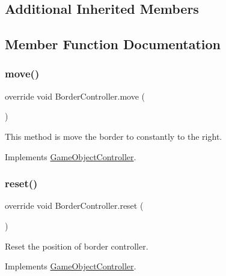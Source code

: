 \subsection*{Additional Inherited Members}


\subsection{Member Function Documentation}
\hypertarget{class_border_controller_ac466a3afffc866364d246b57041c81b2}{}\label{class_border_controller_ac466a3afffc866364d246b57041c81b2} 
\subsubsection{\texorpdfstring{move()}{move()}}
{\footnotesize\ttfamily override void Border\+Controller.\+move (\begin{DoxyParamCaption}{ }\end{DoxyParamCaption})\hspace{0.3cm}{\ttfamily [virtual]}}



This method is move the border to constantly to the right. 



Implements \hyperlink{class_game_object_controller_a0d186d143e280869efaff7835730fc82}{Game\+Object\+Controller}.

\hypertarget{class_border_controller_a8c5ba488fa92cd7753ebce7e3a947a4e}{}\label{class_border_controller_a8c5ba488fa92cd7753ebce7e3a947a4e} 
\subsubsection{\texorpdfstring{reset()}{reset()}}
{\footnotesize\ttfamily override void Border\+Controller.\+reset (\begin{DoxyParamCaption}{ }\end{DoxyParamCaption})\hspace{0.3cm}{\ttfamily [virtual]}}



Reset the position of border controller. 



Implements \hyperlink{class_game_object_controller_a5e57dfd66120a1400e5947f5664a41e4}{Game\+Object\+Controller}.

